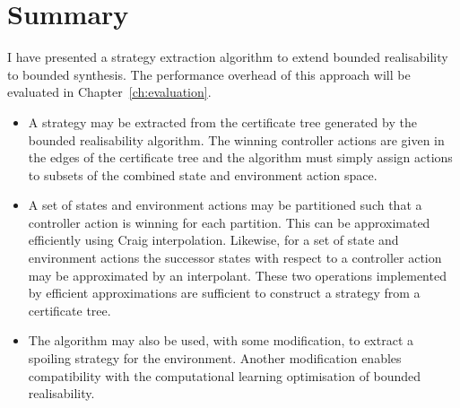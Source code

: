 \section{Summary}


I have presented a strategy extraction algorithm to extend bounded realisability to bounded synthesis. The performance overhead of this approach will be evaluated in Chapter~\ref{ch:evaluation}.

\begin{itemize}
    \item A strategy may be extracted from the certificate tree generated by the bounded realisability algorithm. The winning controller actions are given in the edges of the certificate tree and the algorithm must simply assign actions to subsets of the combined state and environment action space.

    \item A set of states and environment actions may be partitioned such that a controller action is winning for each partition. This can be approximated efficiently using Craig interpolation.  Likewise, for a set of state and environment actions the successor states with respect to a controller action may be approximated by an interpolant. These two operations implemented by efficient approximations are sufficient to construct a strategy from a certificate tree.

    \item The algorithm may also be used, with some modification, to extract a spoiling strategy for the environment. Another modification enables compatibility with the computational learning optimisation of bounded realisability.

\end{itemize}
